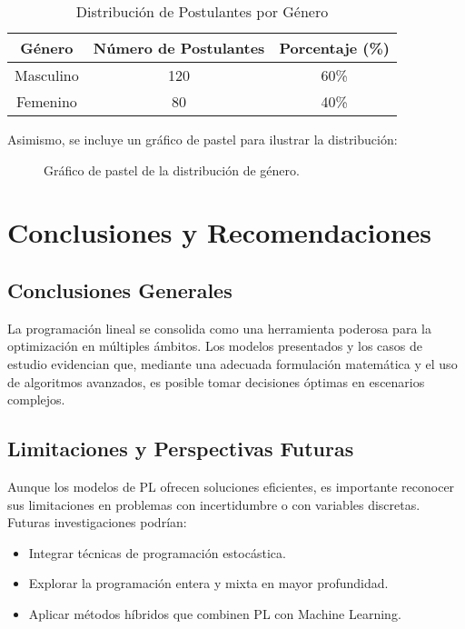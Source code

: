 	\begin{table}[H]
		\centering
		\caption{Distribución de Postulantes por Género}
		\begin{tabular}{ccc}
			\toprule
			\textbf{Género} & \textbf{Número de Postulantes} & \textbf{Porcentaje (\%)} \\
			\midrule
			Masculino & 120 & 60\% \\
			Femenino  & 80  & 40\% \\
			\bottomrule
		\end{tabular}
	\end{table}
	
	Asimismo, se incluye un gráfico de pastel para ilustrar la distribución:
	
	\begin{figure}[H]
		\centering
		\caption{Gráfico de pastel de la distribución de género.}
		\label{fig:piechart_gender}
	\end{figure}
	\section{Conclusiones y Recomendaciones}
	
	\subsection{Conclusiones Generales}
	La programación lineal se consolida como una herramienta poderosa para la optimización en múltiples ámbitos. Los modelos presentados y los casos de estudio evidencian que, mediante una adecuada formulación matemática y el uso de algoritmos avanzados, es posible tomar decisiones óptimas en escenarios complejos.
	
	\subsection{Limitaciones y Perspectivas Futuras}
	Aunque los modelos de PL ofrecen soluciones eficientes, es importante reconocer sus limitaciones en problemas con incertidumbre o con variables discretas. Futuras investigaciones podrían:
	\begin{itemize}[noitemsep]
		\item Integrar técnicas de programación estocástica.
		\item Explorar la programación entera y mixta en mayor profundidad.
		\item Aplicar métodos híbridos que combinen PL con Machine Learning.
	\end{itemize}
	
